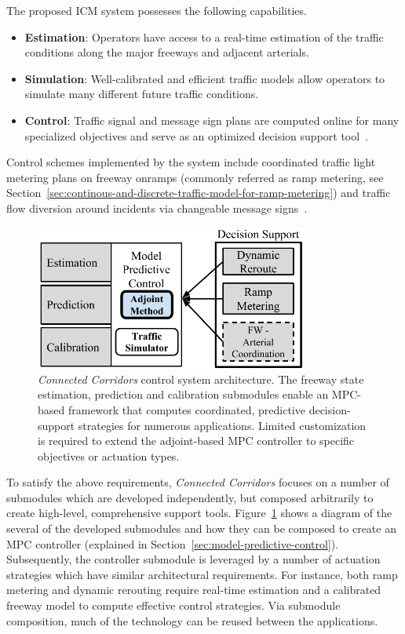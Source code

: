The proposed ICM system possesses the following capabilities.

\begin{itemize}
	\item \textbf{Estimation}: Operators have access to a real-time estimation of the traffic conditions along the major freeways and adjacent arterials.
	\item \textbf{Simulation}: Well-calibrated and efficient traffic models allow operators to simulate many different future traffic conditions.
	\item \textbf{Control}: Traffic signal and message sign plans are computed online for many specialized objectives and serve as an optimized decision support tool~\cite{Reilly2013b,Reilly2014b}.
\end{itemize}

Control schemes implemented by the system include coordinated traffic light metering plans on freeway onramps (commonly referred as ramp metering, see Section~\ref{sec:continous-and-discrete-traffic-model-for-ramp-metering}) and traffic flow diversion around incidents via changeable message signs~\cite{Samaranayake2014}. 

\begin{figure}[htbp]
	\centering
	\includegraphics[width=0.8\textwidth]{diagrams/f2}
	\caption{\emph{Connected Corridors} control system architecture. The freeway state estimation, prediction and calibration submodules enable an MPC-based framework that computes coordinated, predictive decision-support strategies for numerous applications. Limited customization is required to extend the adjoint-based MPC controller to specific objectives or actuation types.}
	\label{fig:decision-support}
\end{figure}

To satisfy the above requirements, \emph{Connected Corridors} focuses on a number of submodules which are developed independently, but composed arbitrarily to create high-level, comprehensive support tools. Figure~\ref{fig:decision-support} shows a diagram of the several of the developed submodules and how they can be composed to create an MPC controller (explained in Section~\ref{sec:model-predictive-control}). Subsequently, the controller submodule is leveraged by a number of actuation strategies which have similar architectural requirements. For instance, both ramp metering and dynamic rerouting require real-time estimation and a calibrated freeway model to compute effective control strategies. Via submodule composition, much of the technology can be reused between the applications.


